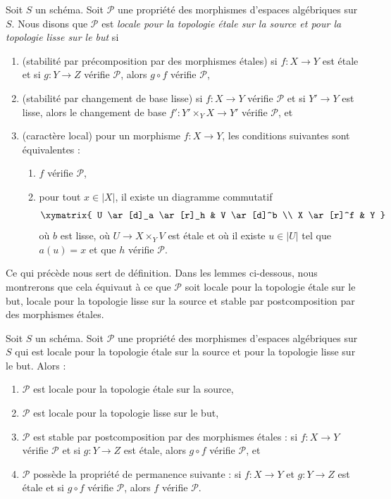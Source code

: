 \begin{definition}
\label{definition-etale-smooth-local-source-target}
Soit $S$ un schéma.
Soit $\mathcal{P}$ une propriété des morphismes d'espaces algébriques sur $S$.
Nous disons que $\mathcal{P}$ est {\it locale pour la topologie \'etale sur la source et pour la topologie lisse sur le but} si
\begin{enumerate}
\item (stabilité par précomposition par des morphismes \'etales)
si $f : X \to Y$ est \'etale et si $g : Y \to Z$ vérifie $\mathcal{P}$,
alors $g \circ f$ vérifie $\mathcal{P}$,
\item (stabilité par changement de base lisse)
si $f : X \to Y$ vérifie $\mathcal{P}$ et si $Y' \to Y$ est lisse, alors
le changement de base $f' : Y' \times_Y X \to Y'$ vérifie $\mathcal{P}$, et
\item (caractère local) pour un morphisme $f : X \to Y$, les conditions suivantes sont
équivalentes :
\begin{enumerate}
\item $f$ vérifie $\mathcal{P}$,
\item pour tout $x \in |X|$, il existe un diagramme commutatif
$$
\xymatrix{
U \ar[d]_a \ar[r]_h & V \ar[d]^b \\
X \ar[r]^f & Y
}
$$
où $b$ est lisse, où $U \to X \times_Y V$ est \'etale
et où il existe $u \in |U|$ tel que $a(u) = x$ et que
$h$ vérifie $\mathcal{P}$.
\end{enumerate}
\end{enumerate}
\end{definition}

\noindent
Ce qui précède nous sert de définition. Dans les lemmes ci-dessous, nous montrerons que
cela équivaut à ce que $\mathcal{P}$ soit locale pour la topologie \'etale sur le but,
locale pour la topologie lisse sur la source et stable par postcomposition par des
morphismes \'etales.

\begin{lemma}
\label{lemma-etale-smooth-local-source-target-implies}
Soit $S$ un schéma.
Soit $\mathcal{P}$ une propriété des morphismes d'espaces algébriques sur $S$
qui est locale pour la topologie \'etale sur la source et pour la topologie lisse sur le but. Alors :
\begin{enumerate}
\item $\mathcal{P}$ est locale pour la topologie \'etale sur la source,
\item $\mathcal{P}$ est locale pour la topologie lisse sur le but,
\item $\mathcal{P}$ est stable par postcomposition par des morphismes \'etales :
si $f : X \to Y$ vérifie $\mathcal{P}$ et si $g : Y \to Z$ est \'etale, alors
$g \circ f$ vérifie $\mathcal{P}$, et
\item $\mathcal{P}$ possède la propriété de permanence suivante : si $f : X \to Y$ et
$g : Y \to Z$ est \'etale et si $g \circ f$ vérifie $\mathcal{P}$, alors
$f$ vérifie $\mathcal{P}$.
\end{enumerate}
\end{lemma}

